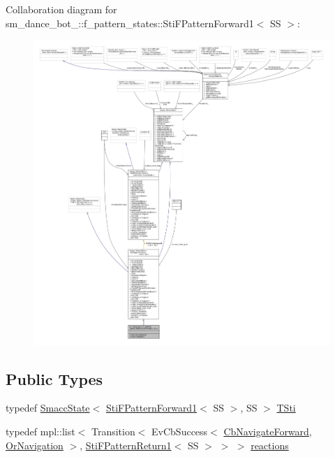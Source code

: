 Collaboration diagram for sm\+\_\+dance\+\_\+bot\+\_\+:\+:f\+\_\+pattern\+\_\+states\+:\+:Sti\+F\+Pattern\+Forward1$<$ SS $>$\+:
\nopagebreak
\begin{figure}[H]
\begin{center}
\leavevmode
\includegraphics[width=350pt]{classsm__dance__bot__2_1_1f__pattern__states_1_1StiFPatternForward1__coll__graph}
\end{center}
\end{figure}
\subsection*{Public Types}
\begin{DoxyCompactItemize}
\item 
typedef \hyperlink{classSmaccState}{Smacc\+State}$<$ \hyperlink{classsm__dance__bot__2_1_1f__pattern__states_1_1StiFPatternForward1}{Sti\+F\+Pattern\+Forward1}$<$ SS $>$, SS $>$ \hyperlink{classsm__dance__bot__2_1_1f__pattern__states_1_1StiFPatternForward1_ae9c3d8c44d0033b6250097ac69011f6a}{T\+Sti}
\item 
typedef mpl\+::list$<$ Transition$<$ Ev\+Cb\+Success$<$ \hyperlink{classcl__move__base__z_1_1CbNavigateForward}{Cb\+Navigate\+Forward}, \hyperlink{classsm__dance__bot__2_1_1OrNavigation}{Or\+Navigation} $>$, \hyperlink{classsm__dance__bot__2_1_1f__pattern__states_1_1StiFPatternReturn1}{Sti\+F\+Pattern\+Return1}$<$ SS $>$ $>$ $>$ \hyperlink{classsm__dance__bot__2_1_1f__pattern__states_1_1StiFPatternForward1_aaa28937a418a04a39855fdfd6f3e7eb8}{reactions}
\end{DoxyCompactItemize}
